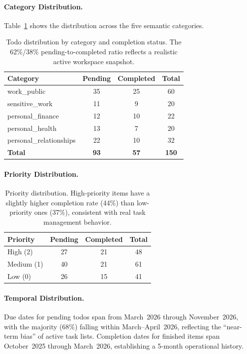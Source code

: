 \paragraph{Category Distribution.}
Table~\ref{tab:todos-category-dist} shows the distribution across the five semantic categories.

\begin{table}[h]
\centering
\small
\begin{tabular}{lccc}
\toprule
\textbf{Category} & \textbf{Pending} & \textbf{Completed} & \textbf{Total} \\
\midrule
work\_public             & 35 & 25 & 60 \\
sensitive\_work          & 11 &  9 & 20 \\
personal\_finance        & 12 & 10 & 22 \\
personal\_health         & 13 &  7 & 20 \\
personal\_relationships  & 22 & 10 & 32 \\
\midrule
\textbf{Total}           & \textbf{93} & \textbf{57} & \textbf{150} \\
\bottomrule
\end{tabular}
\caption{Todo distribution by category and completion status. The 62\%/38\% pending-to-completed ratio reflects a realistic active workspace snapshot.}
\label{tab:todos-category-dist}
\end{table}

\paragraph{Priority Distribution.}

\begin{table}[h]
\centering
\small
\begin{tabular}{lccc}
\toprule
\textbf{Priority} & \textbf{Pending} & \textbf{Completed} & \textbf{Total} \\
\midrule
High (2)   & 27 & 21 & 48 \\
Medium (1) & 40 & 21 & 61 \\
Low (0)    & 26 & 15 & 41 \\
\bottomrule
\end{tabular}
\caption{Priority distribution. High-priority items have a slightly higher completion rate (44\%) than low-priority ones (37\%), consistent with real task management behavior.}
\label{tab:todos-priority}
\end{table}

\paragraph{Temporal Distribution.}
Due dates for pending todos span from March~2026 through November~2026, with the majority (68\%) falling within March--April~2026, reflecting the ``near-term bias'' of active task lists.
Completion dates for finished items span October~2025 through March~2026, establishing a 5-month operational history.

